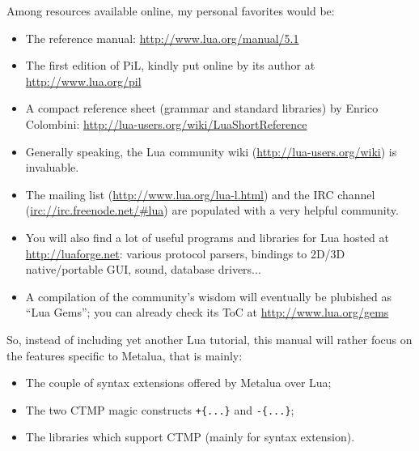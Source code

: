 Among resources available online, my personal favorites would be:
\begin{itemize}
\item The reference manual: \url{http://www.lua.org/manual/5.1}
\item The first edition of PiL, kindly put online by its author at
  \url{http://www.lua.org/pil}
\item A compact reference sheet (grammar and standard libraries) by
  Enrico Colombini: \url{http://lua-users.org/wiki/LuaShortReference}
\item Generally speaking, the Lua community wiki
  (\url{http://lua-users.org/wiki}) is invaluable.
\item The mailing list (\url{http://www.lua.org/lua-l.html})
  and the IRC channel (\url{irc://irc.freenode.net/#lua}) are
  populated with a very helpful community.
\item You will also find a lot of useful programs and libraries for
  Lua hosted at \url{http://luaforge.net}: various protocol parsers, 
  bindings to 2D/3D native/portable GUI, sound, database drivers...
\item A compilation of the community's wisdom will eventually be
  plubished as ``Lua Gems''; you can already check its ToC at
  \url{http://www.lua.org/gems}
\end{itemize}

So, instead of including yet another Lua tutorial, this manual will
rather focus on the features specific to Metalua, that is mainly:
\begin{itemize}
\item The couple of syntax extensions offered by Metalua over Lua;
\item The two CTMP magic constructs \verb|+{...}| and \verb|-{...}|;
\item The libraries which support CTMP (mainly for syntax extension).
\end{itemize}


